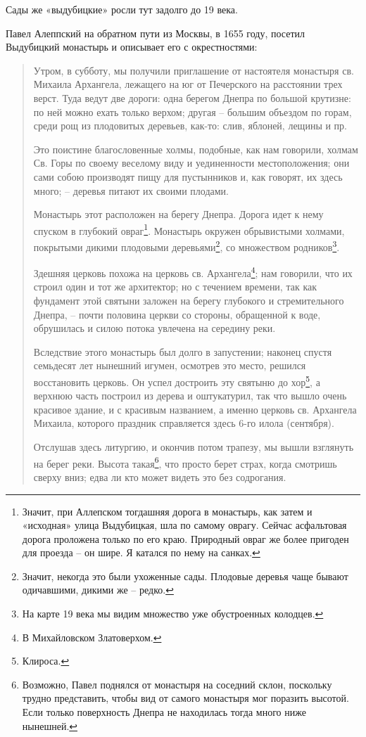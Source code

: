 Сады же «выдубицкие» росли тут задолго до 19 века.

Павел Алеппский на обратном пути из Москвы, в 1655 году, посетил Выдубицкий монастырь и описывает его с окрестностями:

\begin{quotation}  
Утром, в субботу, мы получили приглашение от настоятеля монастыря св. Михаила Архангела, лежащего на юг от Печерского на расстоянии трех верст. Туда ведут две дороги: одна берегом Днепра по большой крутизне: по ней можно ехать только верхом; другая – большим объездом по горам, среди рощ из плодовитых деревьев, как-то: слив, яблоней, лещины и пр. 

Это поистине благословенные холмы, подобные, как нам говорили, холмам Св. Горы по своему веселому виду и уединенности местоположения; они сами собою производят пищу для пустынников и, как говорят, их здесь много; – деревья питают их своими плодами.

Монастырь этот расположен на берегу Днепра. Дорога идет к нему спуском в глубокий овраг\footnote{Значит, при Аллепском тогдашняя дорога в монастырь, как затем и «исходная» улица Выдубицкая, шла по самому оврагу. Сейчас асфальтовая дорога проложена только по его краю. Природный овраг же более пригоден для проезда – он шире. Я катался по нему на санках.}. Монастырь окружен обрывистыми холмами, покрытыми дикими плодовыми деревьями\footnote{Значит, некогда это были ухоженные сады. Плодовые деревья чаще бывают одичавшими, дикими же – редко.}, со множеством родников\footnote{На карте 19 века мы видим множество уже обустроенных колодцев.}.

Здешняя церковь похожа на церковь св. Архангела\footnote{В Михайловском Златоверхом.}; нам говорили, что их строил один и тот же архитектор; но с течением времени, так как фундамент этой святыни заложен на берегу глубокого и стремительного Днепра, – почти половина церкви со стороны, обращенной к воде, обрушилась и силою потока увлечена на середину реки.

Вследствие этого монастырь был долго в запустении; наконец спустя семьдесят лет нынешний игумен, осмотрев это место, решился восстановить церковь. Он успел достроить эту святыню до хор\footnote{Клироса.}, а верхнюю часть построил из дерева и оштукатурил, так что вышло очень красивое здание, и с красивым названием, а именно церковь св. Архангела Михаила, которого праздник справляется здесь 6-го илола (сентября).

Отслушав здесь литургию, и окончив потом трапезу, мы вышли взглянуть на берег реки. Высота такая\footnote{Возможно, Павел поднялся от монастыря на соседний склон, поскольку трудно представить, чтобы вид от самого монастыря мог поразить высотой. Если только поверхность Днепра не находилась тогда много ниже нынешней.}, что просто берет страх, когда смотришь сверху вниз; едва ли кто может видеть это без содрогания.
\end{quotation}  
 
